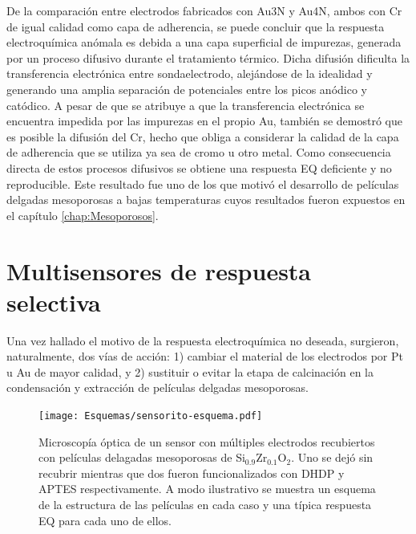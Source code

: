 		    De la comparación entre electrodos fabricados con Au3N y Au4N, ambos con Cr de igual calidad como capa de adherencia, se puede concluir que la respuesta electroquímica anómala es debida a una capa superficial de impurezas, generada por un proceso difusivo durante el tratamiento térmico. Dicha difusión dificulta la transferencia electrónica entre sonda\textbar electrodo, alejándose de la idealidad y generando una amplia separación de potenciales entre los picos anódico y catódico. A pesar de que se atribuye a que la transferencia electrónica se encuentra impedida por las impurezas en el propio Au, también se demostró que es posible la difusión del Cr, hecho que obliga a considerar la calidad de la capa de adherencia que se utiliza ya sea de cromo u otro metal. Como consecuencia directa de estos procesos difusivos se obtiene una respuesta EQ deficiente y no reproducible. Este resultado fue uno de los que motivó el desarrollo de películas delgadas mesoporosas a bajas temperaturas cuyos resultados fueron expuestos en el capítulo \ref{chap:Mesoporosos}.

\section{Multisensores de respuesta selectiva}

			Una vez hallado el motivo de la respuesta electroquímica no deseada, surgieron, naturalmente, dos vías de acción: 1) cambiar el material de los electrodos por Pt u Au de mayor calidad, y 2) sustituir o evitar la etapa de calcinación en la condensación y extracción de películas delgadas mesoporosas.

				\begin{figure}[b!]
		 	       	\begin{center}
		 	       	\texttt{[image: Esquemas/sensorito-esquema.pdf]}
		        	\caption[Esquema de sensores EQ selectivos]{Microscopía óptica de un sensor con múltiples electrodos recubiertos con películas delagadas mesoporosas de Si$_{0.9}$Zr$_{0.1}$O$_2$. Uno se dejó sin recubrir mientras que dos fueron funcionalizados con DHDP y APTES respectivamente. A modo ilustrativo se muestra un esquema de la estructura de las películas en cada caso y una típica respuesta EQ para cada uno de ellos.}
		         	\label{fig:sensor-calesita}
		         	\end{center}
		     		\end{figure}

